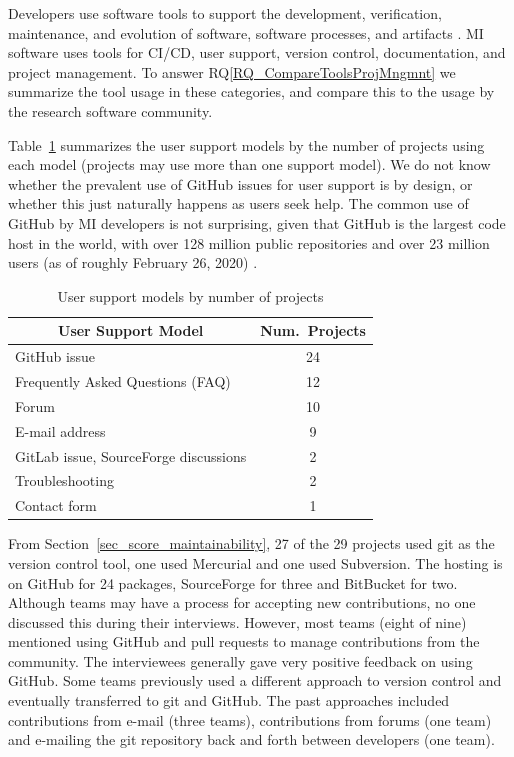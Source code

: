 \documentclass[final, 12pt, 3p, times]{elsarticle}
\newcommand{\rqref}[1]{RQ\ref{#1}}
\begin{document}
Developers use software tools to support the development, verification,
maintenance, and evolution of software, software processes, and artifacts
\cite[p.\ 501]{GhezziEtAl2003}. MI software uses tools for CI/CD, user support,
version control, documentation, and project management.  To answer
\rqref{RQ_CompareToolsProjMngmnt} we summarize the tool usage in these
categories, and compare this to the usage by the research software community.

Table~\ref{tab_user_support_model} summarizes the user support models by the
number of projects using each model (projects may use more than one support
model). We do not know whether the prevalent use of GitHub issues for user
support is by design, or whether this just naturally happens as users seek
help. The common use of GitHub by MI developers is not surprising, given that
GitHub is the largest code host in the world, with over 128 million public
repositories and over 23 million users (as of roughly February 26, 2020)
\cite{Kashyap2020}.

\begin{table}[!ht]
\centering
\begin{tabular}{lc}
\toprule
\multicolumn{1}{c}{User Support Model} & Num.\ Projects \\
\midrule
GitHub issue & 24 \\
Frequently Asked Questions (FAQ) & 12 \\
Forum & 10 \\
E-mail address & 9 \\
GitLab issue, SourceForge discussions & 2 \\
Troubleshooting & 2 \\
Contact form & 1 \\ 
\bottomrule
\end{tabular}
\caption{\label{tab_user_support_model}User support models by number of projects}
\end{table}

From Section~\ref{sec_score_maintainability}, 27 of the 29 projects used git as
the version control tool, one used Mercurial and one used Subversion.  The
hosting is on GitHub for 24 packages, SourceForge for three and BitBucket for
two.  Although teams may have a process for accepting new contributions, no one
discussed this during their interviews. However, most teams (eight of nine)
mentioned using GitHub and pull requests to manage contributions from the
community. The interviewees generally gave very positive feedback on using
GitHub. Some teams previously used a different approach to version control and
eventually transferred to git and GitHub.  The past approaches included
contributions from e-mail (three teams), contributions from forums (one team)
and e-mailing the git repository back and forth between developers (one team).
\end{document}
